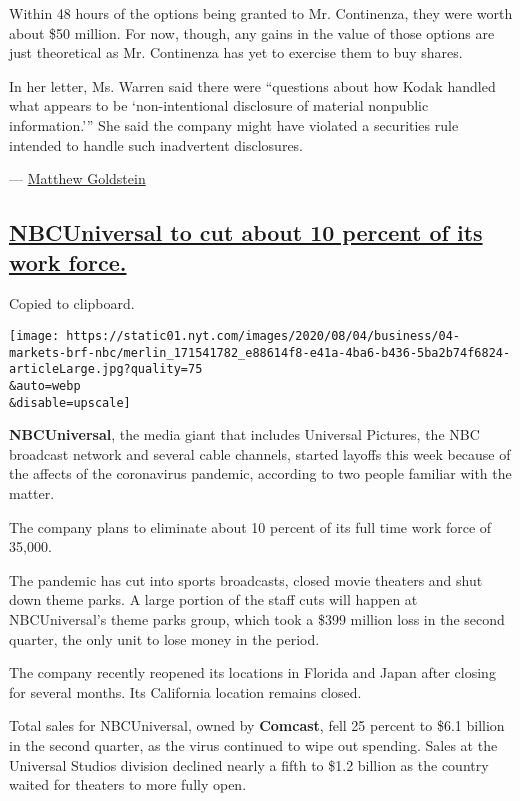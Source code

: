 Within 48 hours of the options being granted to Mr. Continenza, they
were worth about \$50 million. For now, though, any gains in the value
of those options are just theoretical as Mr. Continenza has yet to
exercise them to buy shares.

In her letter, Ms. Warren said there were ``questions about how Kodak
handled what appears to be `non-intentional disclosure of material
nonpublic information.''' She said the company might have violated a
securities rule intended to handle such inadvertent disclosures.

--- \href{https://www.nytimes.com/by/matthew-goldstein}{Matthew
Goldstein}

\hypertarget{nbcuniversal-to-cut-about-10-percent-of-its-work-force}{%
\subsection{\texorpdfstring{\protect\hyperlink{nbcuniversal-to-cut-about-10-percent-of-its-work-force}{NBCUniversal
to cut about 10 percent of its work
force.}}{NBCUniversal to cut about 10 percent of its work force.}}\label{nbcuniversal-to-cut-about-10-percent-of-its-work-force}}

Copied to clipboard.

\texttt{[image: https://static01.nyt.com/images/2020/08/04/business/04-markets-brf-nbc/merlin\_171541782\_e88614f8-e41a-4ba6-b436-5ba2b74f6824-articleLarge.jpg?quality=75\\\&auto=webp\\\&disable=upscale]}

\textbf{NBCUniversal}, the media giant that includes Universal Pictures,
the NBC broadcast network and several cable channels, started layoffs
this week because of the affects of the coronavirus pandemic, according
to two people familiar with the matter.

The company plans to eliminate about 10 percent of its full time work
force of 35,000.

The pandemic has cut into sports broadcasts, closed movie theaters and
shut down theme parks. A large portion of the staff cuts will happen at
NBCUniversal's theme parks group, which took a \$399 million loss in the
second quarter, the only unit to lose money in the period.

The company recently reopened its locations in Florida and Japan after
closing for several months. Its California location remains closed.

Total sales for NBCUniversal, owned by \textbf{Comcast}, fell 25 percent
to \$6.1 billion in the second quarter, as the virus continued to wipe
out spending. Sales at the Universal Studios division declined nearly a
fifth to \$1.2 billion as the country waited for theaters to more fully
open.

